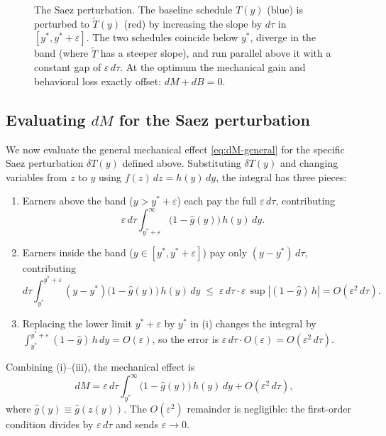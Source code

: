 \documentclass[12pt,a4paper]{article}
\theoremstyle{definition}
\theoremstyle{plain}
\theoremstyle{remark}
\begin{document}
\begin{figure}[H]
\caption{The Saez perturbation.
The baseline schedule $T(y)$ (blue) is perturbed to
$\tilde T(y)$ (red) by increasing the slope by $d\tau$
in $[y^*,y^*+\varepsilon]$.
The two schedules coincide below $y^*$, diverge in the band
(where $\tilde T$ has a steeper slope), and run parallel
above it with a constant gap of $\varepsilon\,d\tau$.
At the optimum the mechanical gain and behavioral loss
exactly offset: $dM+dB=0$.}
\label{fig:saez-perturbation}
\end{figure}
\bigskip

\subsection{Evaluating $dM$ for the Saez perturbation}
\label{sec:mech}

We now evaluate the general mechanical effect \eqref{eq:dM-general} for the specific Saez perturbation $\delta T(y)$ defined above. Substituting $\delta T(y)$ and changing variables from $z$ to $y$ using $f(z)\,dz = h(y)\,dy$, the integral has three pieces:
\begin{enumerate}[label=(\roman*)]
  \item Earners above the band ($y > y^*+\varepsilon$) each pay
    the full $\varepsilon\,d\tau$, contributing
    \[
      \varepsilon\,d\tau
      \int_{y^*+\varepsilon}^{\infty}
      \bigl(1-\hat g(y)\bigr)\,h(y)\,dy.
    \]
  \item Earners inside the band ($y\in[y^*,y^*+\varepsilon]$) pay
    only $(y-y^*)\,d\tau$, contributing
    \[
      d\tau\int_{y^*}^{y^*+\varepsilon}
      (y-y^*)\bigl(1-\hat g(y)\bigr)\,h(y)\,dy
      \;\le\;
      \varepsilon\,d\tau\cdot\varepsilon\,
      \sup|{(1-\hat g)\,h}|
      = O(\varepsilon^2\,d\tau).
    \]
  \item Replacing the lower limit $y^*+\varepsilon$ by $y^*$ in
    (i) changes the integral by
    $\int_{y^*}^{y^*+\varepsilon}(1-\hat g)\,h\,dy = O(\varepsilon)$,
    so the error is $\varepsilon\,d\tau\cdot O(\varepsilon)
    = O(\varepsilon^2\,d\tau)$.
\end{enumerate}
Combining (i)--(iii), the mechanical effect is
\begin{equation}
\label{eq:dM-pert}
  dM = \varepsilon\,d\tau
  \int_{y^*}^{\infty}
  \bigl(1-\hat g(y)\bigr)\,h(y)\,dy
  + O(\varepsilon^2\,d\tau),
\end{equation}
where $\hat g(y) \equiv \hat g(z(y))$.
The $O(\varepsilon^2)$ remainder is negligible: the first-order
condition divides by $\varepsilon\,d\tau$ and sends
$\varepsilon\to 0$.
\end{document}
